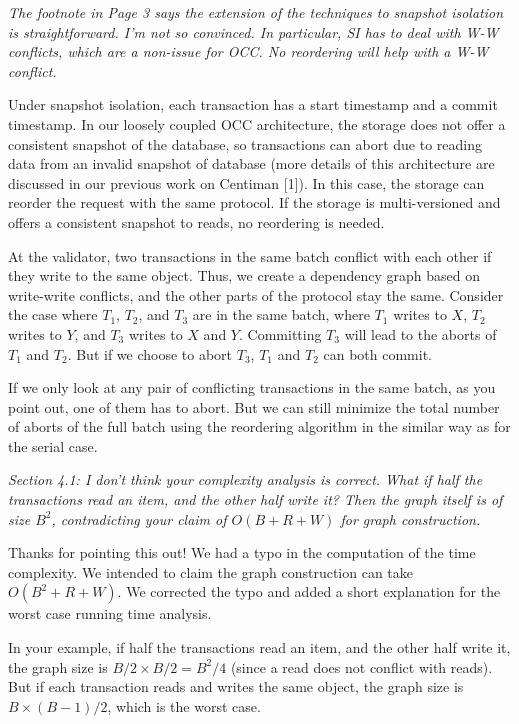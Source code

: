 \documentclass{article}
\begin{document}
\emph{The footnote in Page 3 says the extension of the techniques to snapshot isolation is straightforward. I'm not so convinced. In particular, SI has to deal with W-W conflicts, which are a non-issue for OCC. No reordering will help with a W-W conflict.
}

Under snapshot isolation, each transaction has a start timestamp and a commit timestamp. In our loosely coupled OCC architecture, the storage does not offer a consistent snapshot of the database, so transactions can abort due to reading data from an invalid snapshot of database (more details of this architecture are discussed in our previous work on Centiman [1]). In this case, the storage can reorder the request with the same protocol. If the storage is multi-versioned and offers a consistent snapshot to reads, no reordering is needed.

At the validator, two transactions in the same batch conflict with each other if they write to the same object. Thus, we create a dependency graph based on write-write conflicts, and the other parts of the protocol stay the same. Consider the case where $T_1$, $T_2$, and $T_3$ are in the same batch, where $T_1$ writes to $X$, $T_2$ writes to $Y$, and $T_3$ writes to $X$ and $Y$. Committing $T_3$ will lead to the aborts of $T_1$ and $T_2$. But if we choose to abort $T_3$, $T_1$ and $T_2$ can both commit.

If we only look at any pair of conflicting transactions in the same batch, as you point out, one of them has to abort. But we can still minimize the total number of aborts of the full batch using the reordering algorithm in the similar way as for the serial case.

\emph{Section 4.1: I don't think your complexity analysis is correct. What if half the transactions read an item, and the other half write it? Then the graph itself is of size $B^2$, contradicting your claim of $O(B+R+W)$ for graph construction.}

Thanks for pointing this out! We had a typo in the computation of the time complexity. We intended to claim the graph construction can take $O(B^2+R+W)$. We corrected the typo and added a short explanation for the worst case running time analysis.

In your example, if half the transactions read an item, and the other half write it, the graph size is $B/2\times B/2=B^2/4$ (since a read does not conflict with reads). But if each transaction reads and writes the same object, the graph size is $B\times (B-1)/2$, which is the worst case.
\end{document}
